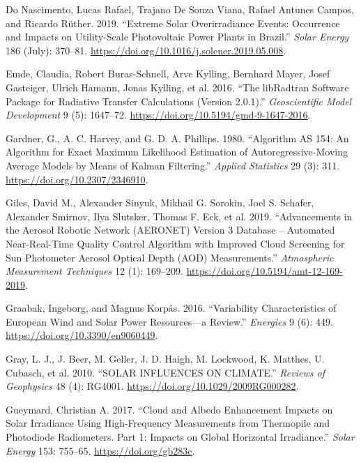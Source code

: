 \documentclass[
]{article}
\newlength{\cslhangindent}
\newlength{\cslentryspacingunit} %
\newenvironment{CSLReferences}[2] %
 {%
  \setlength{\parindent}{0pt}
  \ifodd #1
  \let\oldpar\par
  \def\par{\hangindent=\cslhangindent\oldpar}
  \fi
  \setlength{\parskip}{#2\cslentryspacingunit}
 }%
 {}
\begin{document}
\begin{CSLReferences}{1}{0}
\leavevmode{}%
Do Nascimento, Lucas Rafael, Trajano De Souza Viana, Rafael Antunes Campos, and Ricardo Rüther. 2019. {``Extreme Solar Overirradiance Events: Occurrence and Impacts on Utility-Scale Photovoltaic Power Plants in Brazil.''} \emph{Solar Energy} 186 (July): 370--81. \url{https://doi.org/10.1016/j.solener.2019.05.008}.

\leavevmode{}%
Emde, Claudia, Robert Buras-Schnell, Arve Kylling, Bernhard Mayer, Josef Gasteiger, Ulrich Hamann, Jonas Kylling, et al. 2016. {``The {libRadtran} Software Package for Radiative Transfer Calculations (Version 2.0.1).''} \emph{Geoscientific Model Development} 9 (5): 1647--72. \url{https://doi.org/10.5194/gmd-9-1647-2016}.

\leavevmode{}%
Gardner, G., A. C. Harvey, and G. D. A. Phillips. 1980. {``Algorithm {AS} 154: An Algorithm for Exact Maximum Likelihood Estimation of Autoregressive-Moving Average Models by Means of Kalman Filtering.''} \emph{Applied Statistics} 29 (3): 311. \url{https://doi.org/10.2307/2346910}.

\leavevmode{}%
Giles, David M., Alexander Sinyuk, Mikhail G. Sorokin, Joel S. Schafer, Alexander Smirnov, Ilya Slutsker, Thomas F. Eck, et al. 2019. {``Advancements in the Aerosol Robotic Network ({AERONET}) Version 3 Database -- Automated Near-Real-Time Quality Control Algorithm with Improved Cloud Screening for Sun Photometer Aerosol Optical Depth ({AOD}) Measurements.''} \emph{Atmospheric Measurement Techniques} 12 (1): 169--209. \url{https://doi.org/10.5194/amt-12-169-2019}.

\leavevmode{}%
Graabak, Ingeborg, and Magnus Korpås. 2016. {``Variability Characteristics of European Wind and Solar Power Resources---a Review.''} \emph{Energies} 9 (6): 449. \url{https://doi.org/10.3390/en9060449}.

\leavevmode{}%
Gray, L. J., J. Beer, M. Geller, J. D. Haigh, M. Lockwood, K. Matthes, U. Cubasch, et al. 2010. {``{SOLAR} {INFLUENCES} {ON} {CLIMATE}.''} \emph{Reviews of Geophysics} 48 (4): RG4001. \url{https://doi.org/10.1029/2009RG000282}.

\leavevmode{}%
Gueymard, Christian A. 2017. {``Cloud and Albedo Enhancement Impacts on Solar Irradiance Using High-Frequency Measurements from Thermopile and Photodiode Radiometers. Part 1: Impacts on Global Horizontal Irradiance.''} \emph{Solar Energy} 153: 755--65. \url{https://doi.org/gb283c}.


\end{CSLReferences}
\end{document}
